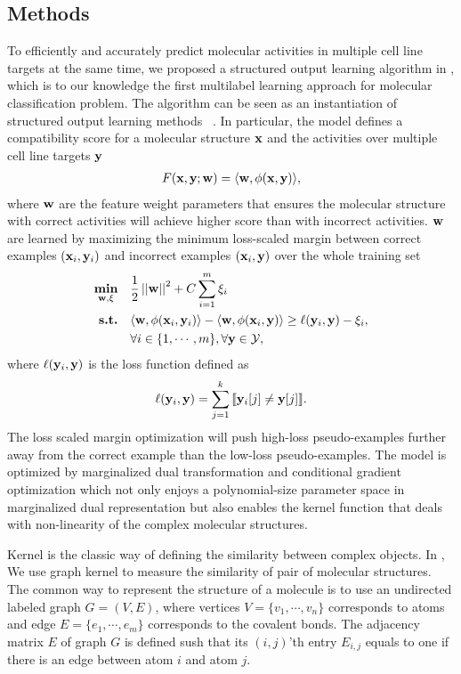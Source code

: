{\subsection{Methods}

To efficiently and accurately predict molecular activities in multiple cell line targets at the same time, we proposed a structured output learning algorithm in , which is to our knowledge the first multilabel learning approach for molecular classification problem.
The algorithm can be seen as an instantiation of structured output learning methods \mmcrf\ \citep{rousu06}.
In particular, the model defines a compatibility score for a molecular structure $\mathbf {x}$ and the activities over multiple cell line targets $\mathbf {y}$
\begin{align*}
	F(\mathbf {x},\mathbf {y};\mathbf {w}) = \langle \mathbf {w}, \phi(\mathbf {x},\mathbf {y}) \rangle,
\end{align*}
where $\mathbf {w}$ are the feature weight parameters that ensures the molecular structure with correct activities will achieve higher score than with incorrect activities.
$\mathbf {w}$ are learned by maximizing the minimum loss-scaled margin between correct examples $(\mathbf {x}_i,\mathbf {y}_i)$ and incorrect examples $(\mathbf {x}_i,\mathbf {y})$ over the whole training set
\begin{align*}
	\underset{\mathbf {w},\mathbf{\xi}}{\textbf{min}} & \quad \frac{1}{2}\left|\left| \mathbf {w} \right|\right|^2 + C\sum_{i=1}^{m}\xi_i\\
	\textbf{s.t.} &\quad \langle \mathbf {w}, \phi(\mathbf {x}_i,\mathbf {y}_i) \rangle - \langle \mathbf {w}, \phi(\mathbf {x}_i,\mathbf {y}) \rangle \ge \ell(\mathbf {y}_i,\mathbf {y})-\xi_i,\\
	&\quad \forall i\in\{1,\cdots,m\}, \forall \mathbf {y}\in\mathcal{Y},
\end{align*}
where $\ell(\mathbf {y}_i,\mathbf {y})$ is the loss function defined as
\begin{align*}
	\ell(\mathbf {y}_i,\mathbf {y}) = \sum_{j=1}^{k}{\llbracket \mathbf {y}_i[j]\neq \mathbf {y}[j] \rrbracket}.
\end{align*}
The loss scaled margin optimization will push high-loss pseudo-examples further away from the correct example than the low-loss pseudo-examples.
The model is optimized by marginalized dual transformation \citep{Taskar04max} and conditional gradient optimization \citep{Bertsekas95nonlinear} which not only enjoys a polynomial-size parameter space in marginalized dual representation but also enables the kernel function that deals with non-linearity of the complex molecular structures.

Kernel is the classic way of defining the similarity between complex objects.
In , We use graph kernel to measure the similarity of pair of molecular structures.
The common way to represent the structure of a molecule is to use an undirected labeled graph $G=(V,E)$, where vertices $V=\{v_1,\cdots,v_n\}$ corresponds to atoms and edge $E=\{e_1,\cdots,e_m\}$ corresponds to the covalent bonds.
The adjacency matrix $E$ of graph $G$ is defined sush that its $(i,j)$'th entry $E_{i,j}$ equals to one if there is an edge between atom $i$ and atom $j$.

}

